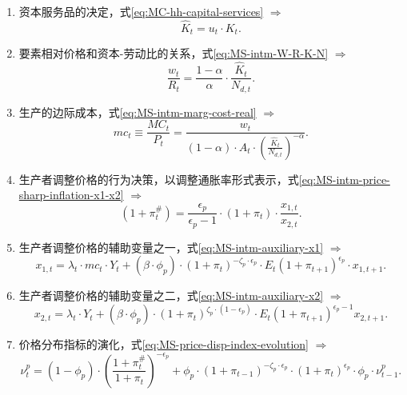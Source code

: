 \begin{enumerate}
\item 资本服务品的决定，式\eqref{eq:MC-hh-capital-services} $\Rightarrow$
\begin{equation*}
\hat{K}_t = u_t \cdot K_t.
\end{equation*}

\item 要素相对价格和资本-劳动比的关系，式\eqref{eq:MS-intm-W-R-K-N} $\Rightarrow$
\begin{equation*}
\frac{w_t}{R_t} = \frac{1-\alpha}{\alpha} \cdot \frac{\hat{K}_t}{N_{d,t}}.
\end{equation*}

\item 生产的边际成本，式\eqref{eq:MS-intm-marg-cost-real} $\Rightarrow$
\begin{equation*}
mc_t \equiv \frac{MC_t}{P_t} = \frac{w_t}{
  \left( 1 - \alpha \right) \cdot A_t \cdot \left( \frac{\hat{K}_t}{N_{d,t}} \right)^{-\alpha}}.
\end{equation*}

\item 生产者调整价格的行为决策，以调整通胀率形式表示，式\eqref{eq:MS-intm-price-sharp-inflation-x1-x2} $\Rightarrow$
\begin{equation*}
\left( 1+\pi^{\#}_t \right) = \frac{\epsilon_p}{\epsilon_p -1} \cdot \left(1 + \pi_t \right)\cdot \frac{x_{1,t}}{x_{2,t}}.
\end{equation*}

\item 生产者调整价格的辅助变量之一，式\eqref{eq:MS-intm-auxiliary-x1} $\Rightarrow$
\begin{equation*}
x_{1,t} = \lambda_t \cdot mc_t \cdot Y_t +\left( \beta \cdot \phi_p \right) \cdot \left( 1+\pi_t \right)^{-\zeta_p \cdot \epsilon_p} \cdot E_t \left( 1+\pi_{t+1} \right)^{\epsilon_p} \cdot x_{1,t+1}.
\end{equation*}

\item 生产者调整价格的辅助变量之二，式\eqref{eq:MS-intm-auxiliary-x2} $\Rightarrow$
\begin{equation*}
x_{2,t} = \lambda_t \cdot Y_t + \left(\beta \cdot \phi_p \right) \cdot
\left(1 + \pi_t \right)^{\zeta_p \cdot \left( 1 - \epsilon_p \right)} \cdot E_t \left( 1 + \pi_{t+1} \right)^{\epsilon_p -1} x_{2,t+1}.
\end{equation*}

\item 价格分布指标的演化，式\eqref{eq:MS-price-disp-index-evolution} $\Rightarrow$
\begin{equation*}
\nu^p_t = \left(1-\phi_p\right) \cdot \left(\frac{1+\pi_{t}^{\#}}{1+\pi_t}\right)^{-\epsilon_p} + \phi_p \cdot
\left(1+\pi_{t-1}\right)^{- \zeta_p \cdot \epsilon_p} \cdot
\left(1+\pi_t\right)^{\epsilon_p} \cdot \phi_p \cdot
\nu^p_{t-1}.
\end{equation*}


\end{enumerate}
